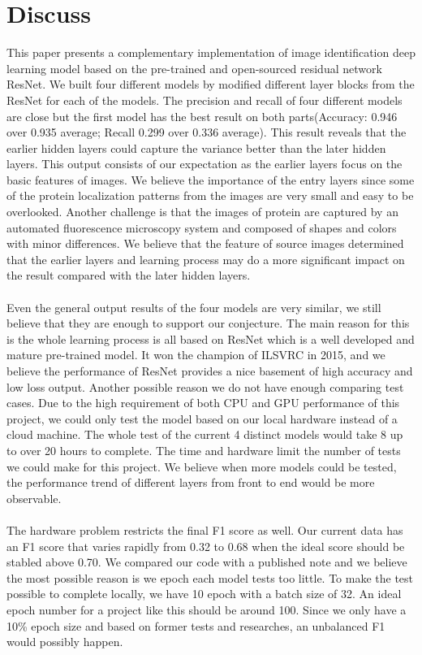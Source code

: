 \documentclass{article}
\begin{document}
\section{Discuss}
This paper presents a complementary implementation of image identification deep learning model based on the pre-trained and open-sourced residual network ResNet. We built four different models by modified different layer blocks from the ResNet for each of the models. The precision and recall of four different models are close but the first model has the best result on both parts(Accuracy: 0.946 over 0.935 average; Recall 0.299 over 0.336 average). This result reveals that the earlier hidden layers could capture the variance better than the later hidden layers. This output consists of our expectation as the earlier layers focus on the basic features of images. We believe the importance of the entry layers since some of the protein localization patterns from the images are very small and easy to be overlooked. Another challenge is that the images of protein are captured by an automated fluorescence microscopy system and composed of shapes and colors with minor differences. We believe that the feature of source images determined that the earlier layers and learning process may do a more significant impact on the result compared with the later hidden layers.
\\
\\
Even the general output results of the four models are very similar, we still believe that they are enough to support our conjecture. The main reason for this is the whole learning process is all based on ResNet which is a well developed and mature pre-trained model. It won the champion of ILSVRC in 2015, and we believe the performance of ResNet provides a nice basement of high accuracy and low loss output.\cite{winner} Another possible reason we do not have enough comparing test cases.
Due to the high requirement of both CPU and GPU performance of this project, we could only test the model based on our local hardware instead of a cloud machine. The whole test of the current 4 distinct models would take 8 up to over 20 hours to complete. The time and hardware limit the number of tests we could make for this project. We believe when more models could be tested, the performance trend of different layers from front to end would be more observable.
\\
\\
The hardware problem restricts the final F1 score as well. Our current data has an F1 score that varies rapidly from 0.32 to 0.68 when the ideal score should be stabled above 0.70. We compared our code with a published note\cite{note} and we believe the most possible reason is we epoch each model tests too little. To make the test possible to complete locally, we have 10 epoch with a batch size of 32. An ideal epoch number for a project like this should be around 100. Since we only have a 10\% epoch size and based on former tests and researches\cite{100epo}, an unbalanced F1 would possibly happen.
\end{document}
